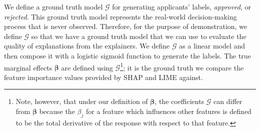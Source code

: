 \documentclass[mnsc,blindrev]{informs3}
\begin{document}

   We define a ground truth model $\mathcal{G}$ for generating applicants' labels, \textit{approved}, or \textit{rejected}. This ground truth model represents the real-world decision-making process that is never observed. Therefore, for the purpose of demonstration, we define $\mathcal{G}$ so that we have a ground truth model that we can use to evaluate the quality of explanations from the explainers. We define $\mathcal{G}$ as a linear model and then compose it with a logistic sigmoid function to generate the labels. The true marginal effects $\boldsymbol{\beta}$ are defined using $\mathcal{G}$\footnote{Note, however, that under our definition of $\boldsymbol{\beta}$, the coefficients $\mathcal{G}$ can differ from $\boldsymbol{\beta}$ because the $\beta_j$ for a feature which influences other features is defined to be the total derivative of the response with respect to that feature.}; it is the ground truth we compare the feature importance values provided by SHAP and LIME against.
   
\end{document}
